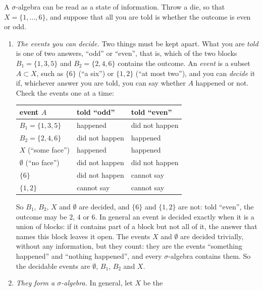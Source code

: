 \begin{notechapter}
\begin{example}\label{measures:ex:partition}
A $\sigma$-algebra can be read as a state of information. Throw a die,
so that $X = \{1, \dots, 6\}$, and suppose that all you are told is
whether the outcome is even or odd.
\begin{enumerate}[nosep]
  \item \emph{The events you can decide.} Two things must be kept
        apart. What you are \emph{told} is one of two answers, ``odd''
        or ``even'', that is, which of the two blocks
        $B_1 = \{1, 3, 5\}$ and $B_2 = \{2, 4, 6\}$ contains the
        outcome. An \emph{event} is a subset $A\subset X$, such as
        $\{6\}$ (``a six'') or $\{1, 2\}$ (``at most two''), and you
        can \emph{decide} it if, whichever answer you are told, you
        can say whether $A$ happened or not. Check the events one at
        a time:
        \begin{center}
        \begin{tabular}{lll}
          \toprule
          event $A$ & told ``odd'' & told ``even'' \\
          \midrule
          $B_1 = \{1, 3, 5\}$ & happened & did not happen \\
          $B_2 = \{2, 4, 6\}$ & did not happen & happened \\
          $X$ (``some face'') & happened & happened \\
          $\emptyset$ (``no face'') & did not happen & did not happen \\
          $\{6\}$ & did not happen & cannot say \\
          $\{1, 2\}$ & cannot say & cannot say \\
          \bottomrule
        \end{tabular}
        \end{center}
        So $B_1$, $B_2$, $X$ and $\emptyset$ are decided, and $\{6\}$
        and $\{1, 2\}$ are not: told ``even'', the outcome may be $2$,
        $4$ or $6$. In general an event is decided exactly when it is
        a union of blocks: if it contains part of a block but not all
        of it, the answer that names this block leaves it open. The
        events $X$ and $\emptyset$ are decided trivially, without any
        information, but they count: they are the events ``something
        happened'' and ``nothing happened'', and every
        $\sigma$-algebra contains them. So the decidable events are
        $\emptyset$, $B_1$, $B_2$ and $X$.
  \item \emph{They form a $\sigma$-algebra.} In general, let $X$ be the

\end{enumerate}
\end{example}
\end{notechapter}
